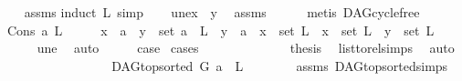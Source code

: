 \begin{isabellebody}
%
\isadelimproof
\ \ %
\endisadelimproof
%
\isatagproof
{}\isamarkupfalse%
\ assms\isanewline
{}\isamarkupfalse%
{\isacharparenleft}{\kern0pt}induct\ L{\isacharcomma}{\kern0pt}\ simp{\isacharparenright}{\kern0pt}\isanewline
\ \ \isamarkupfalse%
\ une{\isacharcolon}{\kern0pt}{\isachardoublequoteopen}x\ {\isasymnoteq}\ y{\isachardoublequoteclose}\ \isamarkupfalse%
\ assms\isanewline
\ \ \ \ \isamarkupfalse%
\ {\isacharparenleft}{\kern0pt}metis\ DAG{\isachardot}{\kern0pt}cycle{\isacharunderscore}{\kern0pt}free{\isacharparenright}{\kern0pt}\ \isanewline
\ \ \isamarkupfalse%
\ {\isacharparenleft}{\kern0pt}Cons\ a\ L{\isacharparenright}{\kern0pt}\isanewline
\ \ \isamarkupfalse%
\ \isamarkupfalse%
\ {\isachardoublequoteopen}x\ {\isacharequal}{\kern0pt}\ a\ {\isasymand}\ y\ {\isasymin}\ set\ {\isacharparenleft}{\kern0pt}a\ {\isacharhash}{\kern0pt}\ L{\isacharparenright}{\kern0pt}{\isachardoublequoteclose}\ {\isacharbar}{\kern0pt}\ {\isachardoublequoteopen}y\ {\isacharequal}{\kern0pt}\ a\ {\isasymand}\ x\ {\isasymin}\ set\ L{\isachardoublequoteclose}\ {\isacharbar}{\kern0pt}\ {\isachardoublequoteopen}x\ {\isasymin}\ set\ L\ {\isasymand}\ y\ {\isasymin}\ set\ L{\isachardoublequoteclose}\isanewline
\ \ \ \ \isamarkupfalse%
\ une\ \isamarkupfalse%
\ auto\isanewline
\ \ \isamarkupfalse%
\ \isamarkupfalse%
\ {\isacharquery}{\kern0pt}case\ \isamarkupfalse%
{\isacharparenleft}{\kern0pt}cases{\isacharparenright}{\kern0pt}\isanewline
\ \ \ \ \isamarkupfalse%
\ {}\isanewline
\ \ \ \ \isamarkupfalse%
\ \isamarkupfalse%
\ {\isacharquery}{\kern0pt}thesis\ \isamarkupfalse%
\ list{\isacharunderscore}{\kern0pt}to{\isacharunderscore}{\kern0pt}rel{\isachardot}{\kern0pt}simps\ \isamarkupfalse%
\ auto\isanewline
\ \ \isamarkupfalse%
\isanewline
\ \ \ \ \isamarkupfalse%
\ {}\isanewline
\ \ \ \ \isamarkupfalse%
\ \isamarkupfalse%
\ {\isachardoublequoteopen}{\isasymnot}\ DAG{\isachardot}{\kern0pt}top{\isacharunderscore}{\kern0pt}sorted\ G\ {\isacharparenleft}{\kern0pt}a\ {\isacharhash}{\kern0pt}\ L{\isacharparenright}{\kern0pt}{\isachardoublequoteclose}\isanewline
\ \ \ \ \ \ \isamarkupfalse%
\ assms\ DAG{\isachardot}{\kern0pt}top{\isacharunderscore}{\kern0pt}sorted{\isachardot}{\kern0pt}simps{\isacharparenleft}{\kern0pt}{}{\isacharparenright}{\kern0pt}\isanewline

\end{isabellebody}
